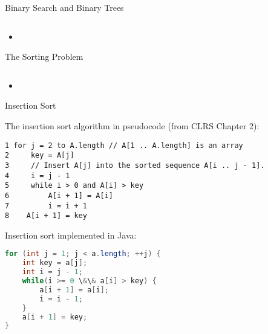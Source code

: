 \documentclass{beamer}
\begin{document}
\begin{frame}[fragile]{Binary Search and Binary Trees}


\begin{lstlisting}[language=Java]

\end{lstlisting}

\begin{itemize}
\item
\end{itemize}


\end{frame}


\begin{frame}[fragile]{The Sorting Problem}


\begin{lstlisting}[language=Java]

\end{lstlisting}

\begin{itemize}
\item
\end{itemize}


\end{frame}


\begin{frame}[fragile]{Insertion Sort}


The insertion sort algorithm in pseudocode (from CLRS Chapter 2):
\vspace{-.05in}
\begin{lstlisting}[]
1 for j = 2 to A.length // A[1 .. A.length] is an array
2     key = A[j]
3     // Insert A[j] into the sorted sequence A[i .. j - 1].
4     i = j - 1
5     while i > 0 and A[i] > key
6         A[i + 1] = A[i]
7         i = i + 1
8    A[i + 1] = key
\end{lstlisting}

Insertion sort implemented in Java:
\vspace{-.05in}
\begin{lstlisting}[language=Java]
for (int j = 1; j < a.length; ++j) {
    int key = a[j];
    int i = j - 1;
    while(i >= 0 \&\& a[i] > key) {
        a[i + 1] = a[i];
        i = i - 1;
    }
    a[i + 1] = key;
}
\end{lstlisting}

\end{frame}
\end{document}
